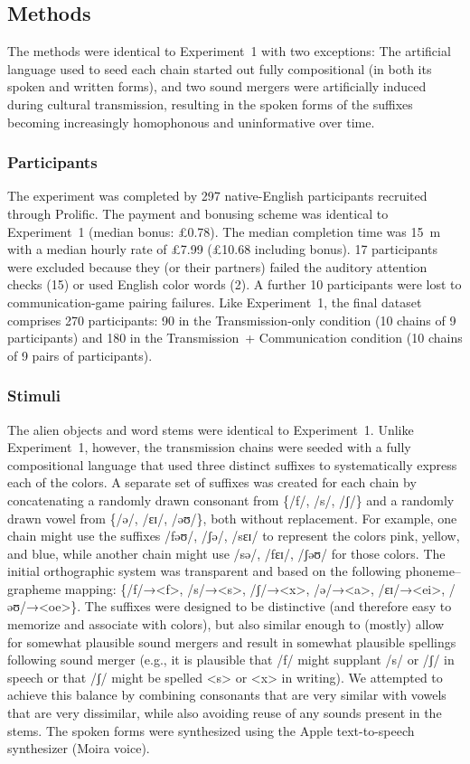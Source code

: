 \documentclass[doc,biblatex]{apa7}
\begin{document}
\subsection{Methods}

The methods were identical to Experiment~1 with two exceptions: The artificial language used to seed each chain started out fully compositional (in both its spoken and written forms), and two sound mergers were artificially induced during cultural transmission, resulting in the spoken forms of the suffixes becoming increasingly homophonous and uninformative over time.

\subsubsection{Participants}

The experiment was completed by 297 native-English participants recruited through Prolific. The payment and bonusing scheme was identical to Experiment~1 (median bonus: £0.78). The median completion time was 15~m with a median hourly rate of £7.99 (£10.68 including bonus). 17 participants were excluded because they (or their partners) failed the auditory attention checks (15) or used English color words (2). A further 10 participants were lost to communication-game pairing failures. Like Experiment~1, the final dataset comprises 270 participants: 90 in the Transmission-only condition (10 chains of 9 participants) and 180 in the Transmission~+ Communication condition (10 chains of 9 pairs of participants).

\subsubsection{Stimuli}

The alien objects and word stems were identical to Experiment~1. Unlike Experiment~1, however, the transmission chains were seeded with a fully compositional language that used three distinct suffixes to systematically express each of the colors. A separate set of suffixes was created for each chain by concatenating a randomly drawn consonant from \{/f/, /s/, /ʃ/\} and a randomly drawn vowel from \{/ə/, /ɛɪ/, /əʊ/\}, both without replacement. For example, one chain might use the suffixes /fəʊ/, /ʃə/, /sɛɪ/ to represent the colors pink, yellow, and blue, while another chain might use /sə/, /fɛɪ/, /ʃəʊ/ for those colors. The initial orthographic system was transparent and based on the following phoneme–grapheme mapping: \{/f/→<f>, /s/→<s>, /ʃ/→<x>, /ə/→<a>, /ɛɪ/→<ei>, /əʊ/→<oe>\}. The suffixes were designed to be distinctive (and therefore easy to memorize and associate with colors), but also similar enough to (mostly) allow for somewhat plausible sound mergers and result in somewhat plausible spellings following sound merger (e.g., it is plausible that /f/ might supplant /s/ or /ʃ/ in speech or that /ʃ/ might be spelled <s> or <x> in writing). We attempted to achieve this balance by combining consonants that are very similar with vowels that are very dissimilar, while also avoiding reuse of any sounds present in the stems. The spoken forms were synthesized using the Apple text-to-speech synthesizer (Moira voice).
\end{document}

